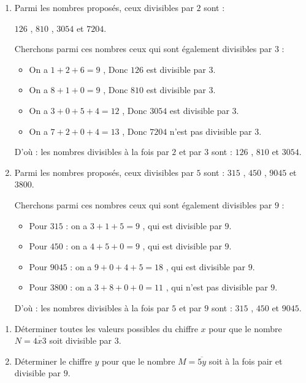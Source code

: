 \documentclass[10pt, a4paper]{article}
\begin{document}
\begin{Solution}[APPLICATION][5]
\begin{enumerate}[leftmargin=*,itemsep=0.5pt]
    \item Parmi les nombres proposés, ceux divisibles par $2$ sont : 
    
    $126$ , $810$  , $3054$ et $7204$.
    
    Cherchons parmi ces nombres ceux qui sont également divisibles par $3$ :
    \begin{itemize}[leftmargin=*,itemsep=0.5pt]
        \item On a $1+2+6 = 9$ , Donc $126$ est divisible par $3$.
        \item On a $8+1+0 = 9$ , Donc $810$ est divisible par $3$.
        \item On a $3+0+5+4 = 12$ , Donc $3054$ est divisible par $3$.
        \item On a $7+2+0+4 = 13$ , Donc $7204$ n'est pas divisible par $3$.
    \end{itemize}
    
    D'où : \quad les nombres divisibles à la fois par $2$ et par $3$ sont : $126$ , $810$ et $3054$.

    \item Parmi les nombres proposés, ceux divisibles par $5$ sont : $315$ , $450$ , $9045$ et $3800$.
    
    Cherchons parmi ces nombres ceux qui sont également divisibles par $9$ :
    \begin{itemize}[leftmargin=*,itemsep=0.5pt]
        \item Pour $315$ : on a $3+1+5 = 9$ , qui est divisible par $9$.
        \item Pour $450$ : on a $4+5+0 = 9$ , qui est divisible par $9$.
        \item Pour $9045$ : on a $9+0+4+5 = 18$ , qui est divisible par $9$.
        \item Pour $3800$ : on a $3+8+0+0 = 11$ , qui n'est pas divisible par $9$.
    \end{itemize}
    
   D'où : \quad les nombres divisibles à la fois par $5$ et par $9$ sont : $315$ , $450$ et $9045$.
\end{enumerate}
\end{Solution}



\begin{Application}[][15 min]
\begin{enumerate}[leftmargin=*,itemsep=0.5pt]
    \item Déterminer toutes les valeurs possibles du chiffre $x$ pour que le nombre $N = \overline{4x3}$ soit divisible par $3$.
    \item Déterminer le chiffre $y$ pour que le nombre $M = \overline{5y}$ soit à la fois pair et divisible par $9$.
\end{enumerate}
\end{Application}
\end{document}
